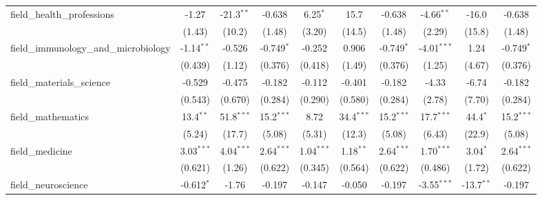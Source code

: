 \begin{tabular}{lccccccccc}
   field\_health\_professions                                  & -1.27          & -21.3$^{**}$  & -0.638         & 6.25$^{*}$     & 15.7         & -0.638         & -4.66$^{**}$   & -16.0         & -0.638\\   
                                                               & (1.43)         & (10.2)        & (1.48)         & (3.20)         & (14.5)       & (1.48)         & (2.29)         & (15.8)        & (1.48)\\   
   field\_immunology\_and\_microbiology                        & -1.14$^{**}$   & -0.526        & -0.749$^{*}$   & -0.252         & 0.906        & -0.749$^{*}$   & -4.01$^{***}$  & 1.24          & -0.749$^{*}$\\   
                                                               & (0.439)        & (1.12)        & (0.376)        & (0.418)        & (1.49)       & (0.376)        & (1.25)         & (4.67)        & (0.376)\\   
   field\_materials\_science                                   & -0.529         & -0.475        & -0.182         & -0.112         & -0.401       & -0.182         & -4.33          & -6.74         & -0.182\\   
                                                               & (0.543)        & (0.670)       & (0.284)        & (0.290)        & (0.580)      & (0.284)        & (2.78)         & (7.70)        & (0.284)\\   
   field\_mathematics                                          & 13.4$^{**}$    & 51.8$^{***}$  & 15.2$^{***}$   & 8.72           & 34.4$^{***}$ & 15.2$^{***}$   & 17.7$^{***}$   & 44.4$^{*}$    & 15.2$^{***}$\\   
                                                               & (5.24)         & (17.7)        & (5.08)         & (5.31)         & (12.3)       & (5.08)         & (6.43)         & (22.9)        & (5.08)\\   
   field\_medicine                                             & 3.03$^{***}$   & 4.04$^{***}$  & 2.64$^{***}$   & 1.04$^{***}$   & 1.18$^{**}$  & 2.64$^{***}$   & 1.70$^{***}$   & 3.04$^{*}$    & 2.64$^{***}$\\   
                                                               & (0.621)        & (1.26)        & (0.622)        & (0.345)        & (0.564)      & (0.622)        & (0.486)        & (1.72)        & (0.622)\\   
   field\_neuroscience                                         & -0.612$^{*}$   & -1.76         & -0.197         & -0.147         & -0.050       & -0.197         & -3.55$^{***}$  & -13.7$^{**}$  & -0.197\\   

\end{tabular}
